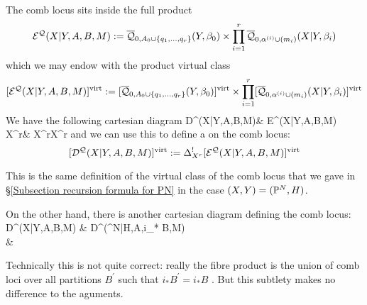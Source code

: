 The comb locus sits inside the full product
\begin{equation*} \mathcal E^{\mathcal{Q}}(X|Y,A,B,M) := \overline{\mathcal Q}_{0,A_0 \cup \{q_1, \ldots, q_r\}}(Y,\beta_0) \times \prod_{i=1}^r \overline{\mathcal Q}_{0,\alpha^{(i)}\cup (m_i)}(X|Y,\beta_i) \end{equation*}
which we may endow with the product virtual class
\begin{equation*} [\mathcal E^{\mathcal{Q}}(X|Y,A,B,M)]^{\operatorname{virt}} := [\overline{\mathcal Q}_{0,A_0 \cup \{q_1, \ldots, q_r\}}(Y,\beta_0)]^{\operatorname{virt}} \times \prod_{i=1}^r [\overline{\mathcal Q}_{0,\alpha^{(i)}\cup (m_i)}(X|Y,\beta_i)]^{\operatorname{virt}} \end{equation*}
We have the following cartesian diagram
\bcd
\mathcal D^{}(X|Y,A,B,M)\ar[r]\ar[d] & \mathcal E^{}(X|Y,A,B,M)\ar[d] \\
X^r\ar[r,"\Delta_{X^r}"] & X^r\times X^r
\ecd
and we can use this to define a  on the comb locus:
\[
 [\mathcal D^{\mathcal{Q}}(X|Y,A,B,M)]^{\operatorname{virt}} := \Delta_{X^r}^![\mathcal E^{\mathcal{Q}}(X|Y,A,B,M)]^{\operatorname{virt}}
\]
\begin{remark} This is the same definition of the virtual class of the comb locus that we gave in \S \ref{Subsection recursion formula for PN} in the case $(X,Y)=(\mathbb P^N,H)$. \end{remark}

On the other hand, there is another cartesian diagram defining the comb locus:
\bcd
\mathcal D^(X|Y,A,B,M) \ar[r,"k"] \ar[d]  & \mathcal D^(\PP^N|H,A,i_* B,M) \ar[d] \\
 \ar[r,"k"] & 
\ecd
\begin{remark} Technically this is not quite correct: really the fibre product is the union of comb loci over all partitions $B^\prime$ such that $i_* B^\prime = i_*B$ . But this subtlety makes no difference to the aguments. \end{remark}

